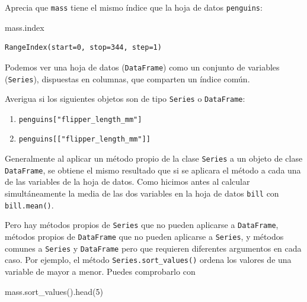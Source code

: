 \documentclass[
  a4paper,
  noprof,
  12pt,
  notoc,
  nosols,
  nobib]{mnye}
\newenvironment{Shaded}{\begin{snugshade}}{\end{snugshade}}
\newcommand{\DecValTok}[1]{\textcolor[rgb]{0.68,0.00,0.00}{#1}}
\newcommand{\NormalTok}[1]{\textcolor[rgb]{0.00,0.23,0.31}{#1}}
\renewenvironment{exercise}[1][]{
            \if\relax\detokenize{#1}\relax
                \ex
            \else
                \ex[note={#1}]
            \fi
        }{\endex}
\theoremstyle{definition}
\newtheorem{exercise}{Ejercicio}[section]
\theoremstyle{remark}
\begin{document}
Aprecia que \texttt{mass} tiene el mismo índice que la hoja de datos
\texttt{penguins}:

\begin{Shaded}
\begin{Highlighting}[]
\NormalTok{mass.index}
\end{Highlighting}
\end{Shaded}

\begin{verbatim}
RangeIndex(start=0, stop=344, step=1)
\end{verbatim}

Podemos ver una hoja de datos (\texttt{DataFrame}) como un conjunto de
variables (\texttt{Series}), dispuestas en columnas, que comparten un
índice común.

\begin{exercise}[]%
\protect\hypertarget{exr-series}{}\label{exr-series}%
Averigua si los siguientes objetos son de tipo \texttt{Series} o
\texttt{DataFrame}:

\begin{enumerate}
\def\labelenumi{\arabic{enumi}.}
\item
  \texttt{penguins{[}"flipper\_length\_mm"{]}}
\item
  \texttt{penguins{[}{[}"flipper\_length\_mm"{]}{]}}
\end{enumerate}

\end{exercise}

Generalmente al aplicar un método propio de la clase \texttt{Series} a
un objeto de clase \texttt{DataFrame}, se obtiene el mismo resultado que
si se aplicara el método a cada una de las variables de la hoja de
datos. Como hicimos antes al calcular simultáneamente la media de las
dos variables en la hoja de datos \texttt{bill} con
\texttt{bill.mean()}.

Pero hay métodos propios de \texttt{Series} que no pueden aplicarse a
\texttt{DataFrame}, métodos propios de \texttt{DataFrame} que no pueden
aplicarse a \texttt{Series}, y métodos comunes a \texttt{Series} y
\texttt{DataFrame} pero que requieren diferentes argumentos en cada
caso. Por ejemplo, el método \texttt{Series.sort\_values()} ordena los
valores de una variable de mayor a menor. Puedes comprobarlo con

\begin{Shaded}
\begin{Highlighting}[]
\NormalTok{mass.sort\_values().head(}\DecValTok{5}\NormalTok{)}
\end{Highlighting}
\end{Shaded}
\end{document}
